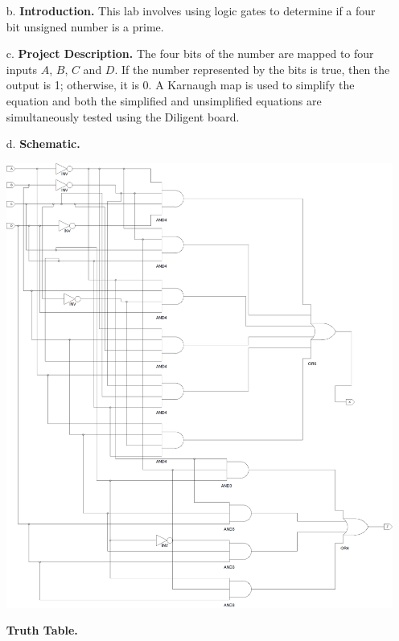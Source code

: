 \documentclass[9pt]{article}
\begin{document}
\begin{enumerate}
   \item[b.] \textbf{Introduction.} This lab involves using logic gates to
               determine if a four bit unsigned number is a prime.
   \item[c.] \textbf{Project Description.} The four bits of the number are
             mapped to four inputs $A$, $B$, $C$ and $D$. If the number
             represented by the bits is true, then the output is 1; otherwise,
             it is 0. A Karnaugh map is used to simplify the equation and both
             the simplified and unsimplified equations are simultaneously tested
             using the Diligent board.
  	\item[d.] \textbf{Schematic.}
             \begin{center}
                \includegraphics[width=\textwidth]{schematic.png}
             \end{center}
             
             \textbf{Truth Table.}   
   

\end{enumerate}
\end{document}
